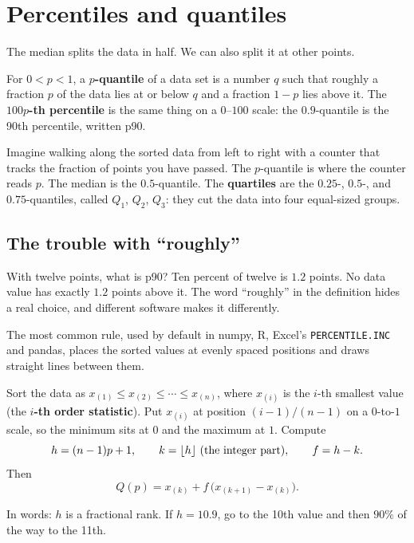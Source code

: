 \section{Percentiles and quantiles}

The median splits the data in half. We can also split it at other points.

\begin{definition}
For $0 < p < 1$, a \textbf{$p$-quantile} of a data set is a number $q$ such that
roughly a fraction $p$ of the data lies at or below $q$ and a fraction $1-p$ lies
above it. The \textbf{$100p$-th percentile} is the same thing on a $0$--$100$ scale:
the $0.9$-quantile is the 90th percentile, written p90.
\end{definition}

Imagine walking along the sorted data from left to right with a counter that tracks
the fraction of points you have passed. The $p$-quantile is where the counter reads
$p$. The median is the $0.5$-quantile. The \textbf{quartiles} are the $0.25$-, $0.5$-,
and $0.75$-quantiles, called $Q_1$, $Q_2$, $Q_3$: they cut the data into four
equal-sized groups.

\subsection{The trouble with ``roughly''}

With twelve points, what is p90? Ten percent of twelve is $1.2$ points. No data
value has exactly $1.2$ points above it. The word ``roughly'' in the definition hides a real choice, and different software makes it differently.

The most common rule, used by default in numpy, R, Excel's \texttt{PERCENTILE.INC} and
pandas, places the sorted values at evenly spaced positions and draws straight lines
between them.

\begin{definition}
Sort the data as $x_{(1)} \le x_{(2)} \le \cdots \le x_{(n)}$, where $x_{(i)}$ is
the $i$-th smallest value (the \textbf{$i$-th order statistic}). Put $x_{(i)}$ at
position $(i-1)/(n-1)$ on a $0$-to-$1$ scale, so the minimum sits at $0$ and the
maximum at $1$. Compute
\[
  h = (n-1)p + 1, \qquad k = \lfloor h\rfloor \text{ (the integer part)}, \qquad f = h - k .
\]
Then
\[
  Q(p) = x_{(k)} + f\,\bigl(x_{(k+1)} - x_{(k)}\bigr).
\]
\end{definition}

In words: $h$ is a fractional rank. If $h = 10.9$, go to the 10th value and then
$90\%$ of the way to the 11th.

